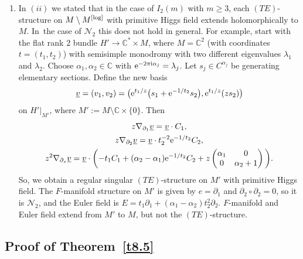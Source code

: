 \documentclass[10pt,a4paper]{amsart}
\numberwithin{equation}{section}
\numberwithin{figure}{section}
\newcommand{\C}{{\mathbb C}}
\newcommand{\EE}{{\mathcal E}}
\newcommand{\NN}{{\mathcal N}}
\newcommand{\uuuu}{\underline}
\newcommand{\paa}{\partial}
\newcommand{\nnn}{\nabla}
\begin{document}
\begin{Remarks}
\begin{enumerate}
\cite{Sa19} starts in our notation from $(TE)$-structures
which are already formally isomorphic to sums
$\bigoplus_{i=1}^n\EE^{u_i/z}z^{\alpha_i}$.
Then it is shown that they are also holomorphically
isomorphic to such sums. In~this special case, Corollary 5.7 in~\cite{DH20-2}
give this implication, too.

\item[$(v)$] In $(ii)$ we stated that in the case of $I_2(m)$
with $m\geq 3$,
each $(TE)$-structure on $M\setminus M^{\rm [log]}$ with primitive
Higgs field extends holomorphically to $M$. In~the case of $\NN_2$ this does not hold in general.
For example, start with the flat rank $2$ bundle
$H'\to\C^*\times M$, where $M=\C^2$ (with coordinates
$t=(t_1,t_2)$) with semisimple monodromy with two
different eigenvalues $\lambda_1$ and $\lambda_2$.
Choose $\alpha_1,\alpha_2\in\C$ with
${\rm e}^{-2\pi {\rm i}\alpha_j}=\lambda_j$. Let $s_j\in C^{\alpha_j}$
be generating elementary sections.
Define the new basis
\begin{gather*}%
\uuuu{v}=(v_1,v_2)=\big({\rm e}^{t_1/z}\big(s_1+{\rm e}^{-1/t_2}s_2\big),{\rm e}^{t_1/z}(zs_2)\big)
\end{gather*}
on $H'|_{M'}$, where $M':=M\setminus \C\times\{0\}$. Then
\begin{gather*}%
z\nnn_{\paa_1}\uuuu{v}=\uuuu{v}\cdot C_1,
\\
z\nnn_{\paa_2}\uuuu{v}=\uuuu{v}\cdot t_2^{-2}{\rm e}^{-1/t_2}C_2,
\\
z^2\nnn_{\paa_z}\uuuu{v}=\uuuu{v}\cdot
\bigg({-}t_1C_1+(\alpha_2-\alpha_1){\rm e}^{-1/t_2}C_2 +
z\begin{pmatrix}\alpha_1&0\\0&\alpha_2+1\end{pmatrix}\bigg).
\end{gather*}
So, we obtain a regular singular $(TE)$-structure on
$M'$ with primitive Higgs field.
The $F$-manifold structure on $M'$ is given by
$e=\paa_1$ and $\paa_2\circ\paa_2=0$, so it is $\NN_2$,
and the Euler field is
$E=t_1\paa_1 + (\alpha_1-\alpha_2)t_2^2\paa_2$.
$F$-manifold and Euler field extend from
$M'$ to $M$, but not the $(TE)$-structure.
\end{enumerate}
\end{Remarks}


\subsection{Proof of Theorem~\ref{t8.5}}\label{c8.3}
\end{document}
